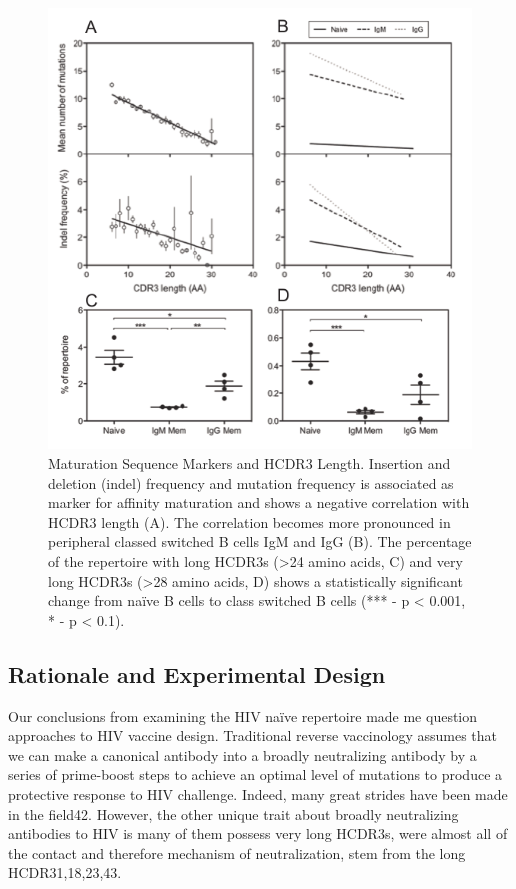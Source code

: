 \begin{figure}[t]
   \centering
   \includegraphics{images/chapter3/figure3_4.pdf} %
   \caption[Maturation Sequence Markers and HCDR3 Length]{Maturation Sequence Markers and HCDR3 Length. Insertion and deletion (indel) frequency and mutation frequency is associated as marker for affinity maturation and shows a negative correlation with HCDR3 length (A). The correlation becomes more pronounced in peripheral classed switched B cells IgM and IgG (B). The percentage of the repertoire with long HCDR3s (>24 amino acids, C) and very long HCDR3s (>28 amino acids, D) shows a statistically significant change from naïve B cells to class switched B cells (*** - p < 0.001, * - p < 0.1).}
   \label{fig:figure3_4}
\end{figure}

\subsection{Rationale and Experimental Design}
Our conclusions from examining the HIV naïve repertoire made me question approaches to HIV vaccine design. Traditional reverse vaccinology assumes that we can make a canonical antibody into a broadly neutralizing antibody by a series of prime-boost steps to achieve an optimal level of mutations to produce a protective response to HIV challenge. Indeed, many great strides have been made in the field42. However, the other unique trait about broadly neutralizing antibodies to HIV is many of them possess very long HCDR3s, were almost all of the contact and therefore mechanism of neutralization, stem from the long HCDR31,18,23,43.

